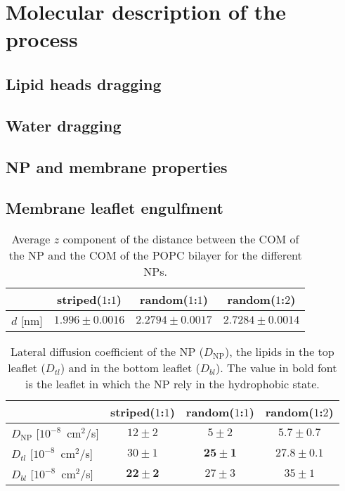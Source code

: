 \chapter{Molecular description of the process}

\section{Lipid heads dragging}

\section{Water dragging}

\section{NP and membrane properties}

\section{Membrane leaflet engulfment}


\begin{table}[h!t]
	\centering
	\begin{tabular}{lccc}
		\toprule
		\,		 & striped($1$:$1$)		& random($1$:$1$)		& random($1$:$2$)		\\ \toprule
		$d$ [nm] & $1.996 \pm 0.0016$	& $2.2794 \pm 0.0017$	& $2.7284 \pm 0.0014$	\\ \bottomrule
	\end{tabular}
	\caption{Average $z$ component of the distance between the \acs{COM} of the \acs{NP} and the \acs{COM} of the \acs{POPC} bilayer for the different \acs{NP}s.}
	\label{tab:NPPOPCCOM}
\end{table}


\begin{table}[h!t]
	\centering
	\begin{tabular}{lccc}
		\toprule
		\,		 & striped($1$:$1$)		& random($1$:$1$)		& random($1$:$2$)		\\ \toprule
		$D_{\text{NP}}$ [$10^{-8}$~cm$^2$/s] & $12 \pm 2$ & $5 \pm 2$ & $5.7 \pm 0.7$ 	\\ \midrule
		$D_{tl}$ [$10^{-8}$~cm$^2$/s] & $30 \pm 1$ & $\mathbf{25 \pm 1}$ & $\mathbf{27.8 \pm 0.1}$		\\ \midrule
		$D_{bl}$ [$10^{-8}$~cm$^2$/s] & $\mathbf{22 \pm 2}$ & $27 \pm 3$	& $35 \pm 1$			\\ \bottomrule
	\end{tabular}
	\caption{Lateral diffusion coefficient of the \acs{NP} ($D_\text{NP}$), the lipids in the top leaflet ($D_{tl}$) and in the bottom leaflet ($D_{bl}$). The value in bold font is the leaflet in which the \ac{NP} rely in the hydrophobic state.}
	\label{tab:NPDiffusion}
\end{table}